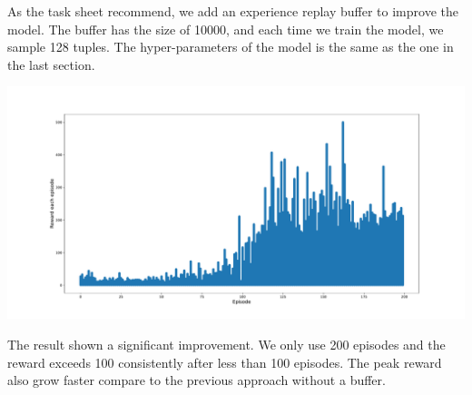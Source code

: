 \documentclass[11pt]{article}
\begin{document}
As the task sheet recommend, we add an experience replay buffer to improve the model. The buffer has the size of 10000, and each time we train the model, we sample 128 tuples. The hyper-parameters of the model is the same as the one in the last section.

\includegraphics[width=\textwidth,height=\textheight,keepaspectratio]{figures/dqn_buffer.pdf}

The result shown a significant improvement. We only use 200 episodes and the reward exceeds 100 consistently after less than 100 episodes. The peak reward also grow faster compare to the previous approach without a buffer.


\end{document}
